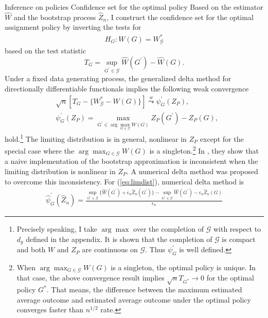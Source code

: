 \documentclass[12pt,oneside,reqno,english]{amsart}
\makeatletter
\renewcommand\subsection{\@startsection{subsection}{2}%
  \z@{-.5\linespacing\@plus-.7\linespacing}{.5\linespacing}%
  {\normalfont\scshape}}
\renewcommand\subsubsection{\@startsection{subsubsection}{3}%
  \z@{.5\linespacing\@plus.7\linespacing}{-.5em}%
  {\normalfont\scshape}}
\theoremstyle{definition}
\makeatother
\begin{document}
\subsection{Inference on policies}\label{test}
\subsubsection{Confidence set for the optimal policy}\label{CS}
Based on the estimator $\hat{W}$ and the bootstrap process $\hat{Z}_{n}$,
I construct the confidence set for the optimal assignment policy by inverting the tests for
\begin{align*}
H_{G}: W(G)=W^{*}_{\mathcal{G}}
\end{align*}  
based on the test statistic
\[T_{G}=\sup_{G^{\prime}\in \mathcal{G}}\hat{W}(G^{\prime})-\hat{W}(G).\]
Under a fixed data generating process, the generalized delta method for directionally differentiable functionals \citep{Shapiro:90, Dumbgen:93} implies the following weak convergence 
\begin{align}
&\sqrt{n}\left[T_{G}-\{W^{*}_{\mathcal{G}}-W(G)\}\right]
\overset{w}{\underset{}{\leadsto}}\psi^{\prime}_{G}(Z_{P}),\label{eq:limdist}\\
&\psi^{\prime}_{G}(Z_{P})=\max_{G^{\prime}\in \arg\max_{G\in \mathcal{G}}W(G)}Z_{P}(G^{\prime})-Z_{P}(G),\nonumber
\end{align}
hold.\footnote{Precisely speaking, I take $\arg\max$ over the completion of $\mathcal{G}$ with respect to $d_{g}$ defined in the appendix.
It is shown that the completion of $\mathcal{G}$ is compact and both $W$ and $Z_{P}$ are continuous on $\mathcal{G}$. Thus $\psi^{\prime}_{G}$ is well defined.} 
The limiting distribution is in general, nonlinear in  $Z_{P}$ except for the special case where the $\arg\max_{G\in \mathcal{G}}W(G)$ is a singleton.\footnote{
  When $\arg\max_{G\in \mathcal{G}}W(G)$ is a singleton, the optimal policy is unique. In that case, the above convergence result implies 
  $\sqrt{n}T_{G^{*}}\rightarrow 0$ for the optimal policy $G^{*}$. That means, the difference between the maximum estimated average outcome and 
  estimated average outcome under the optimal policy converges faster than $n^{1/2}$ rate.
}
In \cite{FS:16}, they show that a naive implementation of the bootstrap approximation is inconsistent when the limiting distribution is nonlinear in $Z_{P}$. 
A numerical delta method \citep{Dumbgen:93,HL:18} was proposed to overcome this inconsistency. For (\ref{eq:limdist}), numerical delta method is 
\begin{align*}
\hat{\psi}^{\prime}_{G}(\hat{Z}_{n})=\frac{\sup_{G^{\prime}\in \mathcal{G}}\{\hat{W}(G^{\prime})+\epsilon_{n}\hat{Z}_{n}(G^{\prime})\}-\sup_{G^{\prime}\in \mathcal{G}}\hat{W}(G^{\prime})
-\epsilon_{n}\hat{Z}_{n}(G)}{\epsilon_{n}}
\end{align*}
\end{document}
